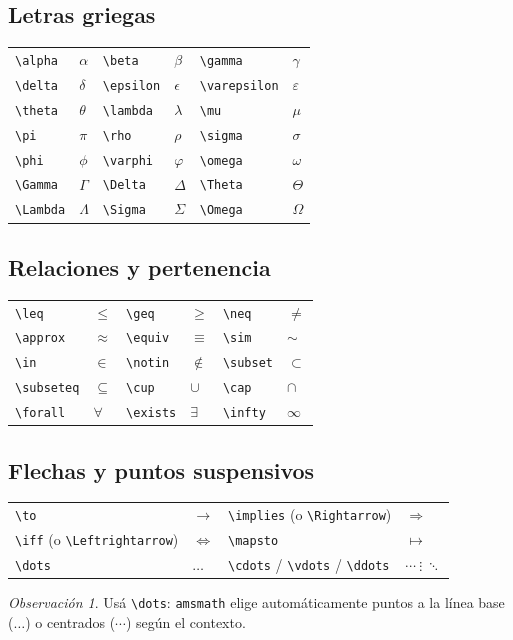 \documentclass[11pt,a4paper]{article}
\newcommand{\C}[1]{\texttt{\textbackslash #1}}   %
\theoremstyle{plain}      %
\theoremstyle{definition} %
\theoremstyle{remark}
\newtheorem*{obs}{Observación}
\begin{document}
\subsection{Letras griegas}
\begin{center}
\begin{tabular}{llllll}
\toprule
\C{alpha} & $\alpha$ & \C{beta} & $\beta$ & \C{gamma} & $\gamma$ \\
\C{delta} & $\delta$ & \C{epsilon} & $\epsilon$ & \C{varepsilon} & $\varepsilon$ \\
\C{theta} & $\theta$ & \C{lambda} & $\lambda$ & \C{mu} & $\mu$ \\
\C{pi} & $\pi$ & \C{rho} & $\rho$ & \C{sigma} & $\sigma$ \\
\C{phi} & $\phi$ & \C{varphi} & $\varphi$ & \C{omega} & $\omega$ \\
\midrule
\C{Gamma} & $\Gamma$ & \C{Delta} & $\Delta$ & \C{Theta} & $\Theta$ \\
\C{Lambda} & $\Lambda$ & \C{Sigma} & $\Sigma$ & \C{Omega} & $\Omega$ \\
\bottomrule
\end{tabular}
\end{center}

\subsection{Relaciones y pertenencia}
\begin{center}
\begin{tabular}{llllll}
\toprule
\C{leq} & $\leq$ & \C{geq} & $\geq$ & \C{neq} & $\neq$ \\
\C{approx} & $\approx$ & \C{equiv} & $\equiv$ & \C{sim} & $\sim$ \\
\C{in} & $\in$ & \C{notin} & $\notin$ & \C{subset} & $\subset$ \\
\C{subseteq} & $\subseteq$ & \C{cup} & $\cup$ & \C{cap} & $\cap$ \\
\C{forall} & $\forall$ & \C{exists} & $\exists$ & \C{infty} & $\infty$ \\
\bottomrule
\end{tabular}
\end{center}

\subsection{Flechas y puntos suspensivos}
\begin{center}
\begin{tabular}{llll}
\toprule
\C{to} & $\to$ & \C{implies} (o \C{Rightarrow}) & $\Rightarrow$ \\
\C{iff} (o \C{Leftrightarrow}) & $\Leftrightarrow$ & \C{mapsto} & $\mapsto$ \\
\C{dots} & $\dots$ & \C{cdots} / \C{vdots} / \C{ddots} & $\cdots\ \vdots\ \ddots$ \\
\bottomrule
\end{tabular}
\end{center}
\begin{obs}
Usá \C{dots}: \texttt{amsmath} elige automáticamente puntos a la línea base
($\ldots$) o centrados ($\cdots$) según el contexto.
\end{obs}
\end{document}
